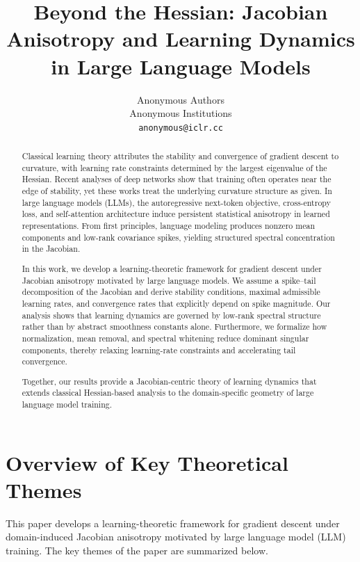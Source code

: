 \documentclass{article}
\title{Beyond the Hessian: Jacobian Anisotropy and Learning Dynamics in Large Language Models}
\author{
  Anonymous Authors\\
  Anonymous Institutions\\
  \texttt{anonymous@iclr.cc}
}
\begin{document}
\maketitle

\begin{abstract}

Classical learning theory attributes the stability and convergence of
gradient descent to curvature, with learning rate constraints determined
by the largest eigenvalue of the Hessian.
Recent analyses of deep networks show that training often operates near
the edge of stability, yet these works treat the underlying curvature
structure as given.
In large language models (LLMs), the autoregressive next-token objective,
cross-entropy loss, and self-attention architecture induce persistent
statistical anisotropy in learned representations.
From first principles, language modeling produces nonzero mean components
and low-rank covariance spikes, yielding structured spectral concentration
in the Jacobian.

In this work, we develop a learning-theoretic framework for gradient descent
under Jacobian anisotropy motivated by large language models.
We assume a spike--tail decomposition of the Jacobian and derive
stability conditions, maximal admissible learning rates,
and convergence rates that explicitly depend on spike magnitude.
Our analysis shows that learning dynamics are governed by low-rank
spectral structure rather than by abstract smoothness constants alone.
Furthermore, we formalize how normalization, mean removal,
and spectral whitening reduce dominant singular components,
thereby relaxing learning-rate constraints and accelerating
tail convergence.

Together, our results provide a Jacobian-centric theory of learning
dynamics that extends classical Hessian-based analysis to the
domain-specific geometry of large language model training.

\end{abstract}







\section{Overview of Key Theoretical Themes}

This paper develops a learning-theoretic framework for gradient descent
under domain-induced Jacobian anisotropy motivated by large language
model (LLM) training. The key themes of the paper are summarized below.
\end{document}
